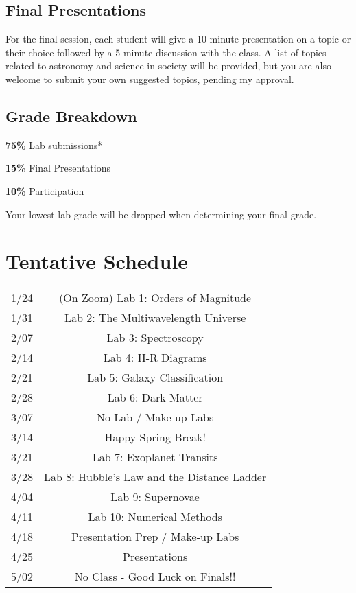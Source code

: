 \documentclass[11pt]{article}
\begin{document}
\subsection*{Final Presentations}
\noindent For the final session, each student will give a 10-minute presentation on a topic or their choice followed by a 5-minute discussion with the class. A list of topics related to astronomy and science in society will be provided, but you are also welcome to submit your own suggested topics, pending my approval.

\subsection*{Grade Breakdown}
\noindent \textbf{75\%} Lab submissions*

\noindent \textbf{15\%} Final Presentations

\noindent \textbf{10\%} Participation

\noindent *Your lowest lab grade will be dropped when determining your final grade.

\section*{Tentative Schedule}

\begin{tabular}{cc}
    1/24 & (On Zoom) Lab 1: Orders of Magnitude\\
    1/31 & Lab 2: The Multiwavelength Universe\\
    2/07 & Lab 3: Spectroscopy\\
    2/14 & Lab 4: H-R Diagrams\\
    2/21 & Lab 5: Galaxy Classification\\
    2/28 & Lab 6: Dark Matter\\
    3/07 & No Lab / Make-up Labs\\
    3/14 & Happy Spring Break!\\
    3/21 & Lab 7: Exoplanet Transits\\
    3/28 & Lab 8: Hubble's Law and the Distance Ladder\\
    4/04 & Lab 9: Supernovae\\
    4/11 & Lab 10: Numerical Methods\\
    4/18 & Presentation Prep / Make-up Labs\\
    4/25 & Presentations\\
    5/02 & No Class - Good Luck on Finals!!
\end{tabular}
\end{document}

